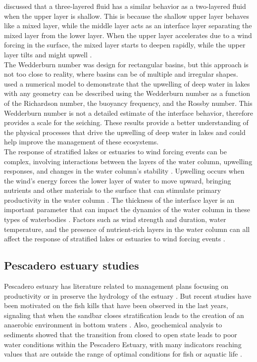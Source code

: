 \documentclass[tesis.tex]{subfiles}
\begin{document}
\cite{Monismith1985} discussed that a three-layered fluid has a similar behavior as a two-layered fluid when the upper layer is shallow. This is because the shallow upper layer behaves like a mixed layer, while the middle layer acts as an interface layer separating the mixed layer from the lower layer. When the upper layer accelerates due to a wind forcing in the surface, the mixed layer starts to deepen rapidly, while the upper layer tilts and might upwell \citep{monismith2006vertical}.\\

The Wedderburn number was design for rectangular basins, but this approach is not too close to reality, where basins can be of multiple and irregular shapes. \cite{Shintani2010} used a numerical model to demonstrate that the upwelling of deep water in lakes with any geometry can be described using the Wedderburn number as a function of the Richardson number, the buoyancy frequency, and the Rossby number. This Wedderburn number is not a detailed estimate of the interface behavior, therefore provides a scale for the seiching. These results provide a better understanding of the physical processes that drive the upwelling of deep water in lakes and could help improve the management of these ecosystems.\\

The response of stratified lakes or estuaries to wind forcing events can be complex, involving interactions between the layers of the water column, upwelling responses, and changes in the water column's stability \citep{jayaweera2019turbulent}. Upwelling occurs when the wind's energy forces the lower layer of water to move upward, bringing nutrients and other materials to the surface that can stimulate primary productivity in the water column \citep{bastidas2021comparison}. The thickness of the interface layer is an important parameter that can impact the dynamics of the water column in these types of waterbodies \citep{xu2017vertical}. Factors such as wind strength and duration, water temperature, and the presence of nutrient-rich layers in the water column can all affect the response of stratified lakes or estuaries to wind forcing events \citep{nidheesh2018stratification}.\\

\subsection{Pescadero estuary studies}

Pescadero estuary has literature related to management plans focusing on productivity \citep{curry1985pescadero} or in preserve the hydrology of the estuary \citep{williams1990pescadero}. But recent studies have been motivated on the fish kills that have been observed in the last years, signaling that when the sandbar closes stratification leads to the creation of an anaerobic environment in bottom waters \citep{sloan2006ecological}. Also, geochemical analysis to sediments showed that the transition from closed to open state leads to poor water conditions within the Pescadero Estuary, with many indicators reaching values that are outside the range of optimal conditions for fish or aquatic life \citep{richards2018}. \\
\end{document}
